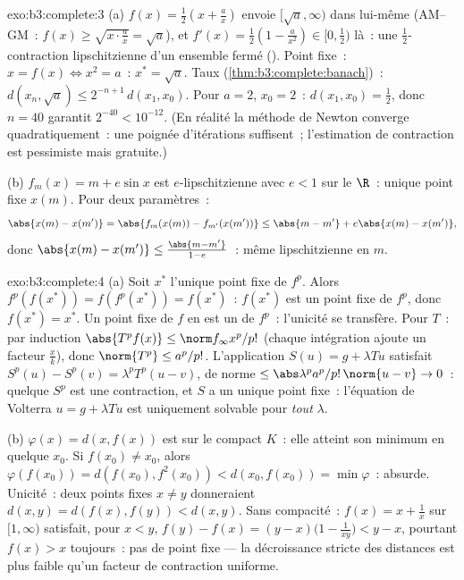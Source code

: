 \begin{solution}{exo:b3:complete:3}
(a) $f(x) = \frac12(x + \frac ax)$ envoie $[\sqrt a, \infty)$
dans lui-même (AM--GM~: $f(x) \geq \sqrt{x \cdot \frac ax} =
\sqrt a$), et $f'(x) = \frac12(1 - \frac a{x^2}) \in [0,
\frac12)$ là~: une $\frac12$-contraction lipschitzienne d'un
ensemble fermé (). Point fixe~: $x = f(x) \iff x^2 =
a$~: $x^* = \sqrt a$. Taux (\cref{thm:b3:complete:banach})~:
$d(x_n, \sqrt a) \leq 2^{-n+1}\,d(x_1, x_0)$. Pour $a = 2$,
$x_0 = 2$~: $d(x_1, x_0) = \frac12$, donc $n = 40$ garantit
$2^{-40} < 10^{-12}$. (En réalité la méthode de Newton
converge quadratiquement~: une poignée d'itérations
suffisent~; l'estimation de contraction est pessimiste mais
gratuite.)

(b) $f_m(x) = m + e\sin x$ est $e$-lipschitzienne avec $e < 1$
sur le  $\R$~: unique point fixe $x(m)$. Pour deux
paramètres~:
\[
\abs{x(m) - x(m')} = \abs{f_m(x(m)) - f_{m'}(x(m'))}
\leq \abs{m - m'} + e\abs{x(m) - x(m')},
\]
donc $\abs{x(m) - x(m')} \leq \frac{\abs{m - m'}}{1 - e}$~:
même lipschitzienne en $m$.
\end{solution}

\begin{solution}{exo:b3:complete:4}
(a) Soit $x^*$ l'unique point fixe de $f^p$. Alors
$f^p(f(x^*)) = f(f^p(x^*)) = f(x^*)$~: $f(x^*)$ est un point
fixe de $f^p$, donc $f(x^*) = x^*$. Un point fixe de $f$ en
est un de $f^p$~: l'unicité se transfère. Pour $T$~: par
induction $\abs{T^pf(x)} \leq \norm f_\infty x^p/p!$ (chaque
intégration ajoute un facteur $\frac xk$), donc $\norm{T^p}
\leq a^p/p!$. L'application $S(u) = g + \lambda Tu$ satisfait
$S^p(u) - S^p(v) = \lambda^pT^p(u - v)$, de norme $\leq
\abs\lambda^pa^p/p!\,\norm{u - v} \to 0$~: quelque $S^p$ est
une contraction, et $S$ a un unique point fixe~: l'équation de
Volterra $u = g + \lambda Tu$ est uniquement solvable pour
\emph{tout} $\lambda$.

(b) $\varphi(x) = d(x, f(x))$ est  sur le compact
$K$~: elle atteint son minimum en quelque $x_0$. Si $f(x_0)
\neq x_0$, alors $\varphi(f(x_0)) = d(f(x_0), f^2(x_0)) <
d(x_0, f(x_0)) = \min\varphi$~: absurde. Unicité~: deux points
fixes $x \ne y$ donneraient $d(x,y) = d(f(x), f(y)) <
d(x,y)$. Sans compacité~: $f(x) = x + \frac1x$ sur $[1,
\infty)$ satisfait, pour $x < y$, $f(y) - f(x) = (y -
x)\bigl(1 - \frac1{xy}\bigr) < y - x$, pourtant $f(x) > x$
toujours~: pas de point fixe --- la décroissance stricte des
distances est plus faible qu'un facteur de contraction
uniforme.
\end{solution}

